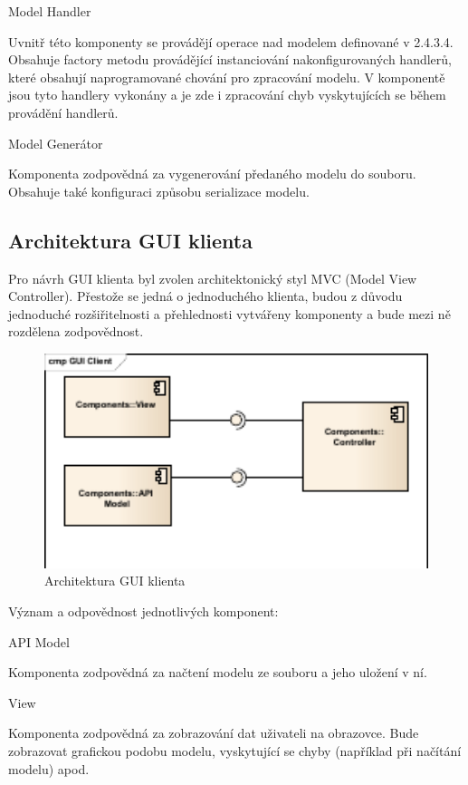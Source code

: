 \documentclass[11pt,twoside,a4paper]{book}
\begin{document}
Model Handler

Uvnitř této komponenty se provádějí operace nad modelem definované v 2.4.3.4. Obsahuje
factory metodu provádějící instanciování nakonfigurovaných handlerů, které obsahují
naprogramované chování pro zpracování modelu. V komponentě jsou tyto handlery vykonány
a je zde i zpracování chyb vyskytujících se během provádění handlerů.

Model Generátor

Komponenta zodpovědná za vygenerování předaného modelu do souboru. Obsahuje také
konfiguraci způsobu serializace modelu.

\subsection{Architektura GUI klienta}

Pro návrh GUI klienta byl zvolen architektonický styl MVC (Model View Controller).
Přestože se jedná o jednoduchého klienta, budou z důvodu jednoduché rozšiřitelnosti a
přehlednosti vytvářeny komponenty a bude mezi ně rozdělena zodpovědnost.

\begin{figure}[h]
\begin{center}
\includegraphics[width=13cm]{images-pdf/GUI-Client.pdf}
\caption{Architektura GUI klienta}
\label{fig:logo}
\end{center}
\end{figure}

Význam a odpovědnost jednotlivých komponent:

API Model

Komponenta zodpovědná za načtení modelu ze souboru a jeho uložení v ní.

View

Komponenta zodpovědná za zobrazování dat uživateli na obrazovce. Bude zobrazovat
grafickou podobu modelu, vyskytující se chyby (například při načítání modelu) apod.
\end{document}
